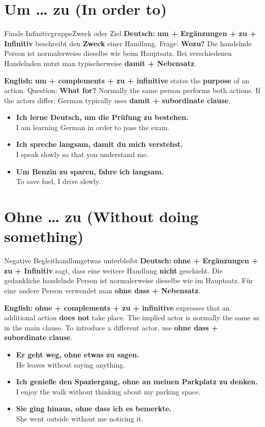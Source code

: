 \documentclass[a4paper,11pt]{article}
\newcommand{\GermanText}[1]{\textbf{Deutsch: }#1\par}
\newcommand{\EnglishText}[1]{{\small\color{SoftGray}\textbf{English: }#1\par}}
\newcommand{\ExampleItem}[2]{\item \textbf{#1}\\{\small\color{SoftGray}#2}}
\begin{document}
\section{Um \ldots{} zu \textnormal{(In order to)}}
\begin{grammarentry}{Finale Infinitivgruppe}{Zweck oder Ziel}
\GermanText{\textbf{um + Ergänzungen + zu + Infinitiv} beschreibt den \textbf{Zweck} einer Handlung. Frage: \textbf{Wozu?} Die handelnde Person ist normalerweise dieselbe wie beim Hauptsatz. Bei verschiedenen Handelnden nutzt man typischerweise \textbf{damit + Nebensatz}.}
\EnglishText{\textbf{um + complements + zu + infinitive} states the \textbf{purpose} of an action. Question: \textbf{What for?} Normally the same person performs both actions. If the actors differ, German typically uses \textbf{damit + subordinate clause}.}
\end{grammarentry}
\begin{exbox}\begin{itemize}
\ExampleItem{Ich lerne Deutsch, um die Prüfung zu bestehen.}{I am learning German in order to pass the exam.}
\ExampleItem{Ich spreche langsam, damit du mich verstehst.}{I speak slowly so that you understand me.}
\ExampleItem{Um Benzin zu sparen, fahre ich langsam.}{To save fuel, I drive slowly.}
\end{itemize}\end{exbox}

\section{Ohne \ldots{} zu \textnormal{(Without doing something)}}
\begin{grammarentry}{Negative Begleithandlung}{etwas unterbleibt}
\GermanText{\textbf{ohne + Ergänzungen + zu + Infinitiv} sagt, dass eine weitere Handlung \textbf{nicht} geschieht. Die gedankliche handelnde Person ist normalerweise dieselbe wie im Hauptsatz. Für eine andere Person verwendet man \textbf{ohne dass + Nebensatz}.}
\EnglishText{\textbf{ohne + complements + zu + infinitive} expresses that an additional action \textbf{does not} take place. The implied actor is normally the same as in the main clause. To introduce a different actor, use \textbf{ohne dass + subordinate clause}.}
\end{grammarentry}
\begin{exbox}\begin{itemize}
\ExampleItem{Er geht weg, ohne etwas zu sagen.}{He leaves without saying anything.}
\ExampleItem{Ich genieße den Spaziergang, ohne an meinen Parkplatz zu denken.}{I enjoy the walk without thinking about my parking space.}
\ExampleItem{Sie ging hinaus, ohne dass ich es bemerkte.}{She went outside without me noticing it.}
\end{itemize}\end{exbox}
\end{document}
